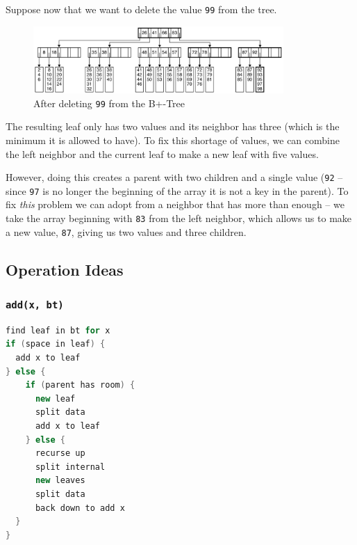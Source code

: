 \documentclass[
  10pt,
  english,
  letterpaper,
,tablecaptionabove
]{scrartcl}
\newcommand{\passthrough}[1]{#1}
\begin{document}
Suppose now that we want to delete the value
\passthrough{\lstinline!99!} from the tree.

\begin{figure}
\centering
\includegraphics[width=0.85\textwidth,height=\textheight]{images/11.png}
\caption{After deleting \passthrough{\lstinline!99!} from the B+-Tree}
\end{figure}

The resulting leaf only has two values and its neighbor has three (which
is the minimum it is allowed to have). To fix this shortage of values,
we can combine the left neighbor and the current leaf to make a new leaf
with five values.

However, doing this creates a parent with two children and a single
value (\passthrough{\lstinline!92!} -- since
\passthrough{\lstinline!97!} is no longer the beginning of the array it
is not a key in the parent). To fix \emph{this} problem we can adopt
from a neighbor that has more than enough -- we take the array beginning
with \passthrough{\lstinline!83!} from the left neighbor, which allows
us to make a new value, \passthrough{\lstinline!87!}, giving us two
values and three children.

\hypertarget{operation-ideas}{%
\subsection{Operation Ideas}\label{operation-ideas}}

\hypertarget{addx-bt}{%
\subsubsection{\texorpdfstring{\texttt{add(x,\ bt)}}{add(x, bt)}}\label{addx-bt}}

\begin{lstlisting}[language=Java]
find leaf in bt for x
if (space in leaf) {
  add x to leaf
} else {
    if (parent has room) {
      new leaf
      split data
      add x to leaf
    } else {
      recurse up
      split internal
      new leaves
      split data
      back down to add x
  }
}
\end{lstlisting}
\end{document}
